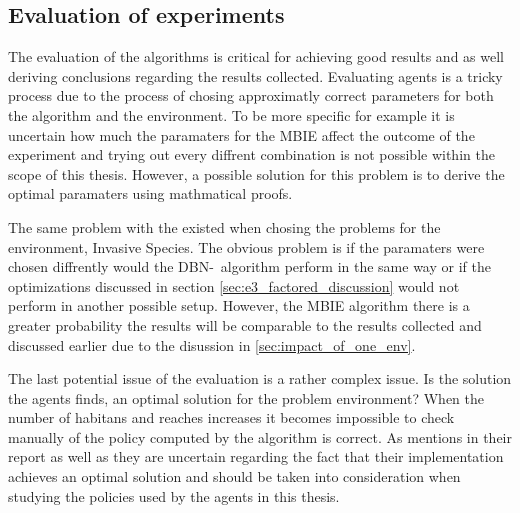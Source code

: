 \subsection{Evaluation of experiments }
The evaluation of the algorithms is critical for achieving good results and as well deriving conclusions regarding the results collected. Evaluating agents is a tricky process due to the process of chosing approximatly correct parameters for both the algorithm and the environment. To be more specific for example it is uncertain how much the paramaters for the MBIE affect the outcome of the experiment and trying out every diffrent combination is not possible within the scope of this thesis. However, a possible solution for this problem is to derive the optimal paramaters using mathmatical proofs.

The same problem with the existed when chosing the problems for the environment, Invasive Species. The obvious problem is if the paramaters were chosen diffrently would the DBN-\etre\ algorithm perform in the same way or if the optimizations discussed in section \ref{sec:e3_factored_discussion} would not perform in another possible setup. However, the MBIE algorithm there is a greater probability the results will be comparable to the results collected and discussed earlier due to the disussion in \ref{sec:impact_of_one_env}.

The last potential issue of the evaluation is a rather complex issue. Is the solution the agents finds, an optimal solution for the problem environment? When the number of habitans and reaches increases it becomes impossible to check manually of the policy computed by the algorithm is correct. As \textcite{dietterich2013pac} mentions in their report as well as they are uncertain regarding the fact that their implementation achieves an optimal solution and should be taken into consideration when studying the policies used by the agents in this thesis.